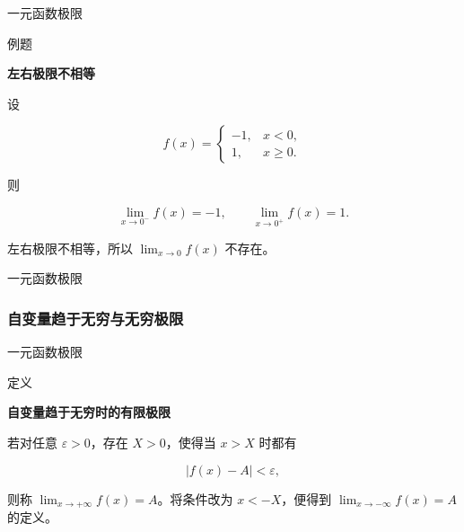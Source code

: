 \documentclass[aspectratio=169,10pt,fontset=fandol]{ctexbeamer}
\begin{document}
\begin{frame}[t,fragile]{一元函数极限}
\normalsize
\begin{block}{例题}
{\normalsize
\textbf{左右极限不相等}\par


设

\[

f(x)=

\begin{cases}

-1,&x<0,\\

1,&x\geq0.

\end{cases}

\]

则

\[

\lim_{x\to0^-}f(x)=-1,\qquad

\lim_{x\to0^+}f(x)=1.

\]

左右极限不相等，所以 \(\lim_{x\to0}f(x)\) 不存在。


}
\end{block}
\end{frame}
\begin{frame}[t,fragile]{一元函数极限}
\normalsize
{\normalsize
\subsubsection*{自变量趋于无穷与无穷极限}




}
\end{frame}
\begin{frame}[t,fragile]{一元函数极限}
\normalsize
\begin{block}{定义}
{\normalsize
\textbf{自变量趋于无穷时的有限极限}\par


若对任意 \(\varepsilon>0\)，存在 \(X>0\)，使得当 \(x>X\) 时都有

\[

|f(x)-A|<\varepsilon,

\]

则称 \(\lim_{x\to+\infty}f(x)=A\)。将条件改为 \(x<-X\)，便得到 \(\lim_{x\to-\infty}f(x)=A\) 的定义。


}
\end{block}
\end{frame}
\end{document}
